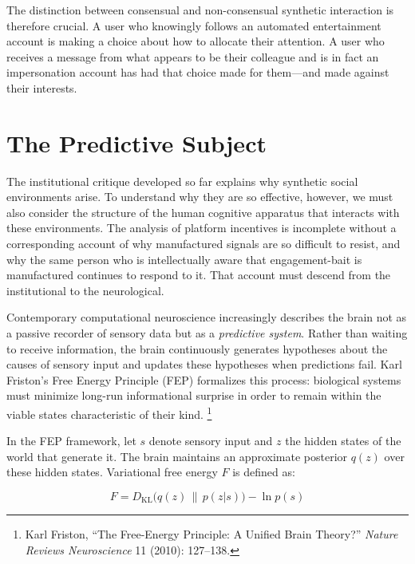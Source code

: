 \documentclass[12pt,a4paper]{article}
\begin{document}
The distinction between consensual and non-consensual synthetic interaction is therefore crucial.
A user who knowingly follows an automated entertainment account is making a choice about how to
allocate their attention. A user who receives a message from what appears to be their colleague
and is in fact an impersonation account has had that choice made for them---and made against
their interests.

\section{The Predictive Subject}

The institutional critique developed so far explains why synthetic social environments arise.
To understand why they are so effective, however, we must also consider the structure of the
human cognitive apparatus that interacts with these environments. The analysis of platform
incentives is incomplete without a corresponding account of why manufactured signals are so
difficult to resist, and why the same person who is intellectually aware that engagement-bait
is manufactured continues to respond to it. That account must descend from the institutional
to the neurological.

Contemporary computational neuroscience increasingly describes the brain not as a passive
recorder of sensory data but as a \emph{predictive system}. Rather than waiting to receive
information, the brain continuously generates hypotheses about the causes of sensory input and
updates these hypotheses when predictions fail. Karl Friston's Free Energy Principle (FEP)
formalizes this process: biological systems must minimize long-run informational surprise in
order to remain within the viable states characteristic of their kind.%
\footnote{Karl Friston, ``The Free-Energy Principle: A Unified Brain Theory?''
\emph{Nature Reviews Neuroscience} 11 (2010): 127--138.}

In the FEP framework, let $s$ denote sensory input and $z$ the hidden states of the world
that generate it. The brain maintains an approximate posterior $q(z)$ over these hidden states.
Variational free energy $F$ is defined as:

\begin{equation}
F = D_{\mathrm{KL}}\!\bigl(q(z)\,\|\,p(z|s)\bigr) - \ln p(s)
\end{equation}
\end{document}
